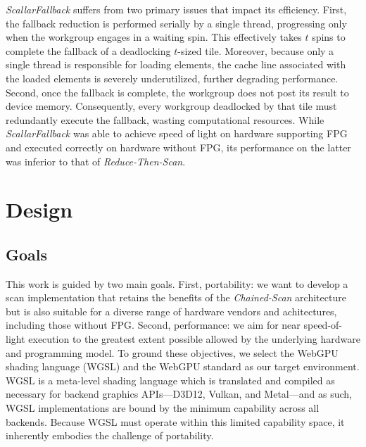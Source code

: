 \documentclass[sigconf]{acmart}
\begin{document}
\emph{ScallarFallback} suffers from two primary issues that impact its efficiency. First, the fallback reduction is performed serially by a single thread, progressing only when the workgroup engages in a waiting spin. This effectively takes $t$ spins to complete the fallback of a deadlocking $t$-sized tile. Moreover, because only a single thread is responsible for loading elements, the cache line associated with the loaded elements is severely underutilized, further degrading performance. Second, once the fallback is complete, the workgroup does not post its result to device memory. Consequently, every workgroup deadlocked by that tile must redundantly execute the fallback, wasting computational resources. While \emph{ScallarFallback} was able to achieve speed of light on hardware supporting FPG and executed correctly on hardware without FPG, its performance on the latter was inferior to that of \emph{Reduce-Then-Scan}.

\section{Design}
\subsection{Goals}
This work is guided by two main goals. First, portability: we want to develop a scan implementation that retains the benefits of the \emph{Chained-Scan} architecture but is also suitable for a diverse range of hardware vendors and achitectures, including those without FPG\@. Second, performance: we aim for near speed-of-light execution to the greatest extent possible allowed by the underlying hardware and programming model. To ground these objectives, we select the WebGPU shading language (WGSL) and the WebGPU standard as our target environment. WGSL is a meta-level shading language which is translated and compiled as necessary for backend graphics APIs---D3D12, Vulkan, and Metal---and as such, WGSL implementations are bound by the minimum capability across all backends. Because WGSL must operate within this limited capability space, it inherently embodies the challenge of portability.
\end{document}
